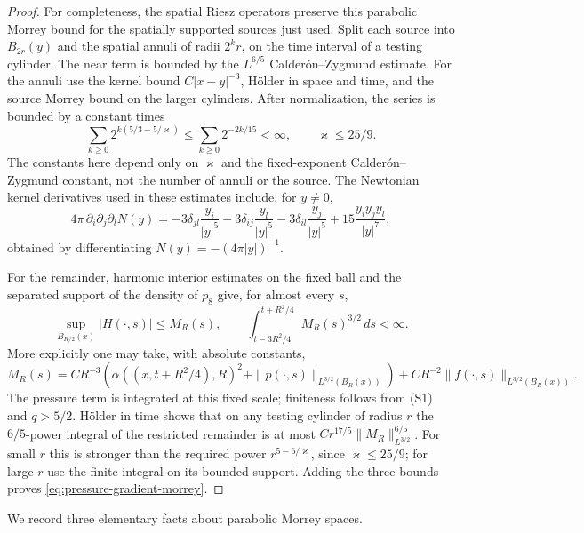 \documentclass[11pt,reqno]{amsart}
\begin{document}
\begin{proof}
For completeness, the spatial Riesz operators preserve this parabolic
Morrey bound for the spatially supported sources just used. Split each
source into $B_{2r}(y)$ and the spatial annuli of radii $2^k r$, on the
time interval of a testing cylinder. The near term is bounded by the
$L^{6/5}$ Calder\'on--Zygmund estimate. For the annuli use the kernel
bound $C|x-y|^{-3}$, H\"older in space and time, and the source Morrey
bound on the larger cylinders. After normalization, the series is bounded
by a constant times
\[
 \sum_{k\ge0}2^{k(5/3-5/\varkappa)}
 \le \sum_{k\ge0}2^{-2k/15}<\infty,
 \qquad \varkappa\le25/9.
\]
The constants here depend only on $\varkappa$ and the fixed-exponent
Calder\'on--Zygmund constant, not the number of annuli or the source.
The Newtonian kernel derivatives used in these estimates include, for
$y\ne0$,
\begin{equation}\label{eq:third-derivative-N}
 4\pi\,\partial_i\partial_j\partial_l N(y)
 =-3\delta_{jl}\frac{y_i}{|y|^5}
  -3\delta_{ij}\frac{y_l}{|y|^5}
  -3\delta_{il}\frac{y_j}{|y|^5}
  +15\frac{y_i y_j y_l}{|y|^7},
\end{equation}
obtained by differentiating $N(y)=-(4\pi|y|)^{-1}$.

For the remainder, harmonic interior estimates on the fixed ball and
the separated support of the density of $p_8$ give, for almost every $s$,
\[
 \sup_{B_{R/2}(x)}|H(\cdot,s)|\le M_R(s),\qquad
 \int_{t-3R^2/4}^{t+R^2/4} M_R(s)^{3/2}\,ds<\infty .
\]
More explicitly one may take, with absolute constants,
\[
 M_R(s)=C R^{-3}\left(\alpha((x,t+R^2/4),R)^2
              +\|p(\cdot,s)\|_{L^{3/2}(B_R(x))}\right)
           +C R^{-2}\|f(\cdot,s)\|_{L^{3/2}(B_R(x))}.
\]
The pressure term is integrated at this fixed scale; finiteness follows
from (S1) and $q>5/2$. H\"older in time shows that on any testing cylinder
of radius $r$ the $6/5$-power integral of the restricted remainder is at
most $C r^{17/5}\|M_R\|_{L^{3/2}}^{6/5}$.
For small $r$ this is stronger than the required power
$r^{5-6/\varkappa}$, since $\varkappa\le25/9$; for large $r$ use the finite
integral on its bounded support. Adding the three bounds proves
\eqref{eq:pressure-gradient-morrey}.
\end{proof}

We record three elementary facts about parabolic Morrey spaces.
\end{document}

